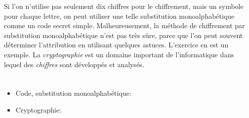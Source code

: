 {{Si l’on n’utilise pas seulement dix chiffres pour le chiffrement, mais un symbole pour chaque lettre, on peut utiliser une telle substitution monoalphabétique comme un code secret simple. Malheureusement, la méthode de chiffrement par substitution monoalphabétique n’est pas très sûre, parce que l’on peut souvent déterminer l’attribution en utilisant quelques astuces. L’exercice en est un exemple. La \emph{cryptographie} est un domaine important de l’informatique dans lequel des \emph{chiffres} sont développés et analysés.



\section*{\BrochureWebsitesAndKeywords}
{\raggedright
\begin{itemize}
  \item Code, substitution monoalphabétique: \href{https://fr.wikipedia.org/wiki/Chiffrement_par_substitution\#Substitution_monoalphab\%C3\%A9tique}{}
  \item Cryptographie: \href{https://fr.wikipedia.org/wiki/Cryptographie}{}
\end{itemize}


}

}{}

\def\AuthorIoannouT{} %
\def\AuthorFeklistovaL{} %
\def\AuthorLuanV{} %
\def\AuthorHromkovicJ{} %
\def\AuthorFreiF{} %
\def\AuthorDatzkoS{} %
\def\AuthorKinciusV{} %
\def\AuthorPelletE{} %

\newpage}{}
